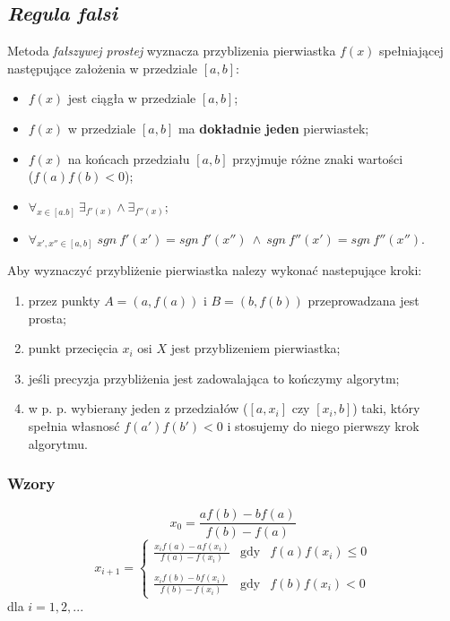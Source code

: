 \documentclass[a4paper,11pt]{article}
\begin{document}
  \subsection{\emph{Regula falsi}}
  Metoda \emph{fałszywej prostej} wyznacza przyblizenia pierwiastka \( f(x) \) spełniającej następujące założenia w przedziale \([a, b]\):
  \begin{itemize}
    \item \( f(x) \) jest ciągła w przedziale \( [a,b] \);
    \item \( f(x) \) w przedziale \( [a,b] \) ma \textbf{dokładnie jeden} pierwiastek;
    \item \( f(x) \) na końcach przedziału \( [a,b] \) przyjmuje różne znaki wartości \\(\( f(a) f(b) < 0 \));
    \item \( \forall_{x \in [a.b]} \: \exists_{f'(x)} \wedge \exists_{f''(x)}\);
    \item \( \forall_{x', x''\in [a,b]}\; sgn\: f'(x') = sgn \: f'(x'') \: \wedge \: sgn \: f''(x') = sgn \: f''(x'') \).
  \end{itemize}
  Aby wyznaczyć przybliżenie pierwiastka nalezy wykonać nastepujące kroki:
  \begin{enumerate}
    \item przez punkty \(A = (a, f(a))\) i \(B = (b, f(b))\) przeprowadzana jest prosta;
    \item punkt przecięcia \(x_i\) osi \(X\) jest przyblizeniem pierwiastka;
    \item jeśli precyzja przybliżenia jest zadowalająca to kończymy algorytm;
    \item w p. p. wybierany jeden z przedziałów (\( [a, x_i] \) czy \( [x_i, b] \)) taki, który spełnia własnosć \( f(a')f(b') < 0 \) i stosujemy do niego pierwszy krok algorytmu.
  \end{enumerate}
  \subsubsection{Wzory}
    $$ x_{0}=\frac{af(b)-bf(a)}{f(b)-f(a)} $$
    $$ x_{i+1}= \left \{ \begin{array}{lll} 
    \displaystyle{\frac {x_i f(a) - a f(x_i)} {f(a) - f(x_i)}} & \textrm{gdy} & f(a)f(x_i) \le 0 \\ \\
    \displaystyle{\frac {x_i f(b) - b f(x_i)} {f(b) - f(x_i)}} & \textrm{gdy} & f(b)f(x_i) < 0 
  \end{array}\right. $$
  dla \( i = 1,2,... \)
  
\end{document}
